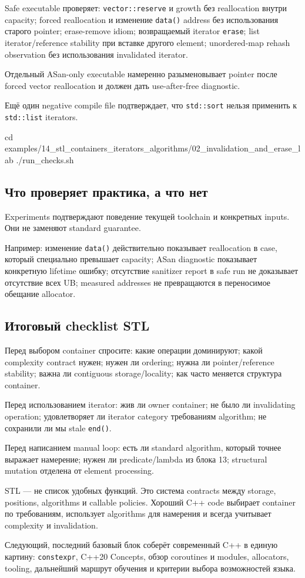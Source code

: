 Safe executable проверяет:
\texttt{vector::reserve} и growth без reallocation внутри capacity; forced reallocation и изменение \texttt{data()} address без использования старого pointer; erase-remove idiom; возвращаемый iterator \texttt{erase}; list iterator/reference stability при вставке другого element; unordered-map rehash observation без использования invalidated iterator.

Отдельный ASan-only executable намеренно разыменовывает pointer после forced
vector reallocation и должен дать use-after-free diagnostic.

Ещё один negative compile file подтверждает, что \texttt{std::sort} нельзя
применить к \texttt{std::list} iterators.

\begin{shellcode}
cd examples/14_stl_containers_iterators_algorithms/02_invalidation_and_erase_lab
./run_checks.sh
\end{shellcode}

\subsection{Что проверяет практика, а что нет}

Experiments подтверждают поведение текущей toolchain и конкретных inputs.
Они не заменяют standard guarantee.

Например:
изменение \texttt{data()} действительно показывает reallocation в case, который специально превышает capacity; ASan diagnostic показывает конкретную lifetime ошибку; отсутствие sanitizer report в safe run не доказывает отсутствие всех UB; measured addresses не превращаются в переносимое обещание allocator.

\subsection{Итоговый checklist STL}

Перед выбором container спросите:
какие операции доминируют; какой complexity contract нужен; нужен ли ordering; нужна ли pointer/reference stability; важна ли contiguous storage/locality; как часто меняется структура container.

Перед использованием iterator:
жив ли owner container; не было ли invalidating operation; удовлетворяет ли iterator category требованиям algorithm; не сохранили ли мы stale \texttt{end()}.

Перед написанием manual loop:
есть ли standard algorithm, который точнее выражает намерение; нужен ли predicate/lambda из блока 13; structural mutation отделена от element processing.

\begin{importantbox}
STL --- не список удобных функций. Это система contracts между storage,
positions, algorithms и callable policies. Хороший C++ code выбирает container
по требованиям, использует algorithms для намерения и всегда учитывает
complexity и invalidation.
\end{importantbox}

Следующий, последний базовый блок соберёт современный C++ в единую картину:
\texttt{constexpr}, C++20 Concepts, обзор coroutines и modules, allocators,
tooling, дальнейший маршрут обучения и критерии выбора возможностей языка.
